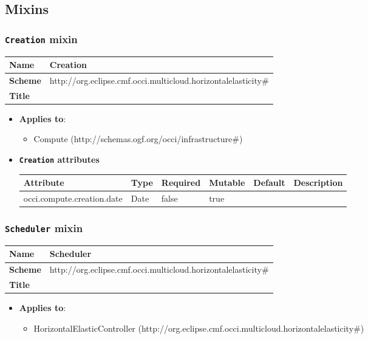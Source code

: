 \subsection{Mixins}
\subsubsection{\texttt{Creation} mixin}
\begin{center}
\begin{tabular}{|l|l|}
  \hline
  \textbf{Name} & Creation \\
  \hline  
  \textbf{Scheme} & http://org.eclipse.cmf.occi.multicloud.horizontalelasticity\# \\
  \hline
  \textbf{Title} &  \\
  \hline
\end{tabular}
\end{center}
\begin{itemize}
\item \textbf{Applies to}:
\begin{itemize}
	\item Compute (http://schemas.ogf.org/occi/infrastructure\#)
\end{itemize}
\end{itemize} 

\begin{itemize}
\item \textbf{\texttt{Creation} attributes}

\begin{tabularx}{\textwidth}{|l|l|p{1.4cm}|p{1.3cm}|l|X|}
  \hline
  \textbf{Attribute} & \textbf{Type} & \textbf{Required} & \textbf{Mutable} & \textbf{Default} & \textbf{Description} \\
  \hline  
  occi.compute.creation.date & Date & false & true &  &  \\
  \hline
\end{tabularx}
\end{itemize}


 
\subsubsection{\texttt{Scheduler} mixin}
\begin{center}
\begin{tabular}{|l|l|}
  \hline
  \textbf{Name} & Scheduler \\
  \hline  
  \textbf{Scheme} & http://org.eclipse.cmf.occi.multicloud.horizontalelasticity\# \\
  \hline
  \textbf{Title} &  \\
  \hline
\end{tabular}
\end{center}
\begin{itemize}
\item \textbf{Applies to}:
\begin{itemize}
	\item HorizontalElasticController (http://org.eclipse.cmf.occi.multicloud.horizontalelasticity\#)
\end{itemize}
\end{itemize} 


